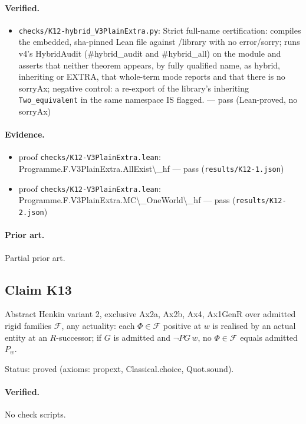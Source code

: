 \documentclass{article}
\begin{document}
\paragraph{Verified.}
\begin{itemize}
\item \texttt{checks/K12-hybrid\_V3PlainExtra.py}: Strict full-name certification: compiles the embedded, sha-pinned Lean file against /library with no error/sorry; runs v4's HybridAudit (\#hybrid\_audit and \#hybrid\_all) on the module and asserts that neither theorem appears, by fully qualified name, as hybrid, inheriting or EXTRA, that whole-term mode reports and that there is no sorryAx; negative control: a re-export of the library's inheriting \texttt{Two\_equivalent} in the same namespace IS flagged. --- pass (Lean-proved, no sorryAx)
\end{itemize}

\paragraph{Evidence.}
\begin{itemize}
\item proof \texttt{checks/K12-V3PlainExtra.lean}: Programme.F.V3PlainExtra.AllExist\textbackslash{}\_hf --- pass (\texttt{results/K12-1.json})
\item proof \texttt{checks/K12-V3PlainExtra.lean}: Programme.F.V3PlainExtra.MC\textbackslash{}\_OneWorld\textbackslash{}\_hf --- pass (\texttt{results/K12-2.json})
\end{itemize}

\paragraph{Prior art.} Partial prior art.

\subsection*{Claim K13}

Abstract Henkin variant 2, exclusive Ax2a, Ax2b, Ax4, Ax1GenR over admitted rigid families $\mathcal F$, any actuality: each $\Phi\in\mathcal F$ positive at $w$ is realised by an actual entity at an $R$-successor; if $G$ is admitted and $\neg PG\,w$, no $\Phi\in\mathcal F$ equals admitted $P_w$.

Status: proved (axioms: propext, Classical.choice, Quot.sound).

\paragraph{Verified.}
No check scripts.
\end{document}
